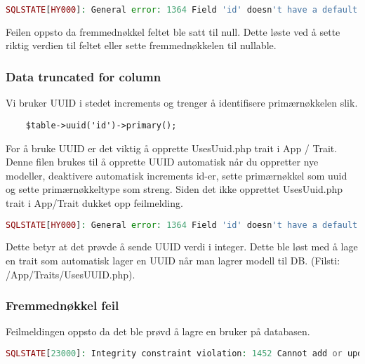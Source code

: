 \begin{lstlisting}[language=PHP]
    SQLSTATE[HY000]: General error: 1364 Field 'id' doesn't have a default value (SQL: insert into `fields` (`name`, `slug`, `updated_at`, `created_at`) values (HELLO WORLD, hello_world, 2019-02-06 08:57:48, 2019-02-06 08:57:48))
\end{lstlisting}

Feilen oppsto da fremmednøkkel feltet ble satt til null. Dette løste ved å sette riktig verdien til feltet eller sette fremmednøkkelen til nullable. 

\subsubsection{Data truncated for column}
Vi bruker UUID i stedet increments og trenger å identifisere primærnøkkelen slik.
\begin{lstlisting}
    $table->uuid('id')->primary();
\end{lstlisting}

For å bruke UUID er det viktig å opprette UsesUuid.php trait i App / Trait.
Denne filen brukes til å opprette UUID automatisk når du oppretter nye modeller, deaktivere automatisk increments id-er, sette primærnøkkel som uuid og sette primærnøkkeltype som streng.\cite{medium2019aut} Siden det ikke opprettet UsesUuid.php trait i App/Trait dukket opp feilmelding. 

\begin{lstlisting}[language=PHP]
SQLSTATE[HY000]: General error: 1364 Field 'id' doesn't have a default value (SQL: insert into `fields` (`name`, `slug`, `updated_at`, `created_at`) values (HELLO WORLD, hello_world, 2019-02-06 08:57:48, 2019-02-06 08:57:48))
\end{lstlisting}
Dette betyr at det prøvde å sende UUID verdi i integer.
Dette ble løst med å lage en trait som automatisk lager en UUID når man lagrer modell til DB. (Filsti: /App/Traits/UsesUUID.php).\cite{powery2018euil}
 
\subsubsection{Fremmednøkkel feil}
Feilmeldingen oppsto da det ble prøvd å lagre en bruker på databasen. 

\begin{lstlisting}[language=PHP]
    SQLSTATE[23000]: Integrity constraint violation: 1452 Cannot add or update a child row: a foreign key constraint fails (`sirkus-media`.`users`, CONSTRAINT `users_image_id_foreign` FOREIGN KEY (`image_id`) REFERENCES `images` (`id`)) (SQL: insert into `users` (`name`, `phone`, `email`, `password`, `image_id`, `verified`, `email_token`, `id`, `updated_at`, `created_at`) values (Bere, 4578891, berg@gmail.com, 1234567r, 2432479, 1, e-token, 53f98032-f9bf-40a6-9d70-ca9c0785d7ee, 2019-02-08 10:11:16, 2019-02-08 10:11:16))
\end{lstlisting}

